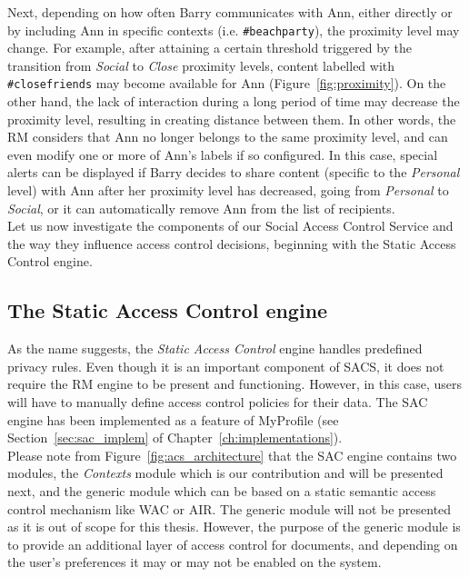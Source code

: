 Next, depending on how often Barry communicates with Ann, either directly or by including Ann in specific contexts (i.e. \verb+#beachparty+), the proximity level may change. For example, after attaining a certain threshold triggered by the transition from \textit{Social} to \textit{Close} proximity levels, content labelled with \verb+#closefriends+ may become available for Ann (Figure~\ref{fig:proximity}). On the other hand, the lack of interaction during a long period of time may decrease the proximity level, resulting in creating distance between them. In other words, the RM considers that Ann no longer belongs to the same proximity level, and can even modify one or more of Ann's labels if so configured. In this case, special alerts can be displayed if Barry decides to share content (specific to the \textit{Personal} level) with Ann after her proximity level has decreased, going from \textit{Personal} to \textit{Social}, or it can automatically remove Ann from the list of recipients.\\

Let us now investigate the components of our Social Access Control Service and the way they influence access control decisions, beginning with the Static Access Control engine.

\subsection{The Static Access Control engine}
\label{subsec:acs}
As the name suggests, the \textit{Static Access Control} engine handles predefined privacy rules. Even though it is an important component of SACS, it does not require the RM engine to be present and functioning. However, in this case, users will have to manually define access control policies for their data. The SAC engine has been implemented as a feature of MyProfile (see Section~\ref{sec:sac_implem} of Chapter~\ref{ch:implementations}).\\

Please note from Figure~\ref{fig:acs_architecture} that the SAC engine contains two modules, the \textit{Contexts} module which is our contribution and will be presented next, and the generic module which can be based on a static semantic access control mechanism like WAC or AIR. The generic module will not be presented as it is out of scope for this thesis. However, the purpose of the generic module is to provide an additional layer of access control for documents, and depending on the user's preferences it may or may not be enabled on the system.

